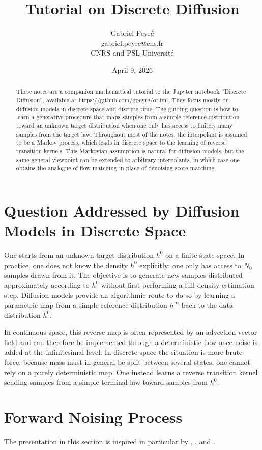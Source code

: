\documentclass[11pt]{article}
\title{Tutorial on Discrete Diffusion}
\author{Gabriel Peyr\'e\\gabriel.peyre@ens.fr\\CNRS and PSL Universit\'e}
\date{April 9, 2026}
\begin{document}
\maketitle

\begin{abstract}
These notes are a companion mathematical tutorial to the Jupyter notebook ``Discrete Diffusion'', available at \url{https://github.com/gpeyre/ot4ml}. They focus mostly on diffusion models in discrete space and discrete time. The guiding question is how to learn a generative procedure that maps samples from a simple reference distribution toward an unknown target distribution when one only has access to finitely many samples from the target law. Throughout most of the notes, the interpolant is assumed to be a Markov process, which leads in discrete space to the learning of reverse transition kernels. This Markovian assumption is natural for diffusion models, but the same general viewpoint can be extended to arbitrary interpolants, in which case one obtains the analogue of flow matching in place of denoising score matching.
\end{abstract}

\section{Question Addressed by Diffusion Models in Discrete Space}
One starts from an unknown target distribution $h^0$ on a finite state space. In practice, one does not know the density $h^0$ explicitly: one only has access to $N_0$ samples drawn from it. The objective is to generate new samples distributed approximately according to $h^0$ without first performing a full density-estimation step. Diffusion models provide an algorithmic route to do so by learning a parametric map from a simple reference distribution $h^\infty$ back to the data distribution $h^0$.

In continuous space, this reverse map is often represented by an advection vector field and can therefore be implemented through a deterministic flow once noise is added at the infinitesimal level. In discrete space the situation is more brute-force: because mass must in general be split between several states, one cannot rely on a purely deterministic map. One instead learns a reverse transition kernel sending samples from a simple terminal law toward samples from $h^0$.

\section{Forward Noising Process}
The presentation in this section is inspired in particular by \citet{austin2021structured}, \citet{campbell2022continuous}, and \citet{pauline2025foundations}.
\end{document}
